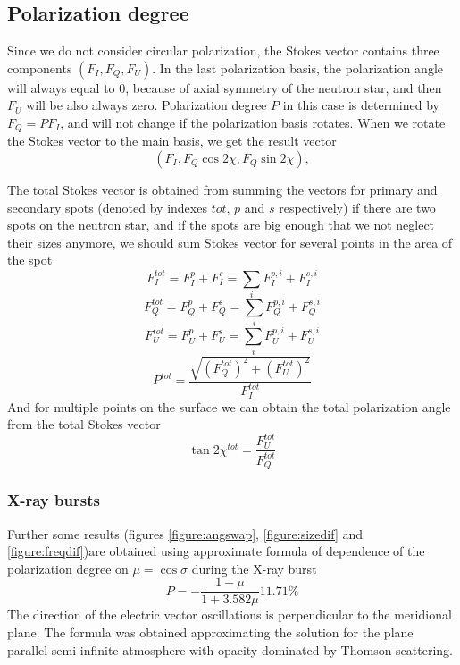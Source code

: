 \documentclass{aa}
\newcommand{\be}{\begin{equation}}
\newcommand{\ee}{\end{equation}}
\begin{document}
\subsection{Polarization degree}
Since we do not consider circular polarization, the Stokes vector contains three components $(F_I,F_Q,F_U)$.
In the last polarization basis, the polarization angle will always equal to 0, because of axial symmetry of the neutron star, and then $F_U$ will be also always zero. Polarization degree $P$ in this case is determined by  $F_Q=P F_I$, and will not change if the polarization basis rotates. When we rotate the Stokes vector to the main basis, we get the result vector $$(F_I, F_Q \cos{2\chi},F_Q \sin{2\chi}),$$   

The total Stokes vector is obtained from summing the vectors for primary and secondary spots (denoted by indexes $tot$, $p$ and $s$ respectively) if there are two spots on the neutron star, and if the spots are big enough that we not neglect their sizes anymore, we should sum Stokes vector for several points in the area of the spot
$$
F_I^{tot}=F_I^p+F_I^s = \sum_i F_I^{p,i}+F_I^{s,i}$$
\be
F_Q^{tot}=F_Q^p+F_Q^s = \sum_i F_Q^{p,i}+F_Q^{s,i}\ee
$$
F_U^{tot}=F_U^p+F_U^s= \sum_i F_U^{p,i}+F_U^{s,i} $$
\be
P^{tot}=\frac{\sqrt{(F_Q^{tot})^2+(F_U^{tot})^2}}{F_I^{tot}}\ee
And for multiple points on the surface we can obtain the total polarization angle from the total Stokes vector\be
\tan{2\chi^{tot}}=\frac{F_U^{tot}}{F_Q^{tot}}\ee

\subsubsection{X-ray bursts}
Further some results (figures \ref{figure:angswap}, \ref{figure:sizedif} and \ref{figure:freqdif})are obtained using approximate formula of dependence of the polarization degree on $\mu=\cos{\sigma}$  during the X-ray burst
\be
P=-\frac{1-\mu}{1+3.582\mu}11.71\%
\ee
The direction of the electric vector oscillations is perpendicular to the meridional plane.
The formula was obtained approximating the solution for the plane parallel semi-infinite atmosphere with opacity dominated by Thomson scattering.



 
\end{document}
